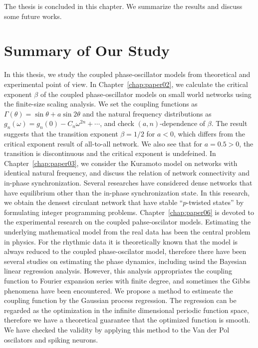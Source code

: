 The thesis is concluded in this chapter.
We summarize the results and discuss some future works.

\section{Summary of Our Study}
In this thesis, we study the coupled phase-oscillator models from theoretical and experimental point of view.
In Chapter~\ref{chap:paper02}, we calculate the critical exponent $\beta$ of the coupled phase-oscillator models on small world networks using the finite-size scaling analysis.
We set the coupling functions as $\Gamma(\theta)=\sin\theta+a\sin2\theta$ and the natural frequency distributions as $g_{n}(\omega)=g_{n}(0)-C_{n}\omega^{2n}+\cdots$, and check $(a,n)$-dependence of $\beta$.
The result suggests that the transition exponent $\beta=1/2$ for $a<0$,
which differs from the critical exponent result of all-to-all network.
We also see that for $a=0.5>0$, the transition is discontinuous and the critical exponent is undefeined.
In Chapter~\ref{chap:paper03}, we consider the Kuramoto model on networks with identical natural frequency, and discuss the relation of network connectivity and in-phase synchronization.
Several researches have considered dense networks that have equilibrium other than the in-phase synchronization state.
In this research, we obtain the densest circulant network that have stable ``$p$-twisted states'' by formulating integer programming problems.
Chapter~\ref{chap:paper06} is devoted to the experimental research on the coupled pahse-oscilator models.
Estimating the underlying mathematical model from the real data has been the central problem in physics.
For the rhythmic data it is theoretically known that the model is always reduced to the coupled phase-oscilator model,
therefore there have been several studies on estimating the phase dynamics,
including usind the Bayesian linear regression analysis.
However, this analysis appropriates the coupling function to Fourier expansion series with finite degree, and sometimes the Gibbs phenomena have been encountered.
We propose a method to estimeate the coupling function by the Gaussian process regression.
The regression can be regarded as the optimization in the infinite dimensional periodic function space, therefore we have a theoretical guarantee that the optimized function is smooth.
We have checked the validity by applying this method to the Van der Pol oscilators and spiking neurons.



